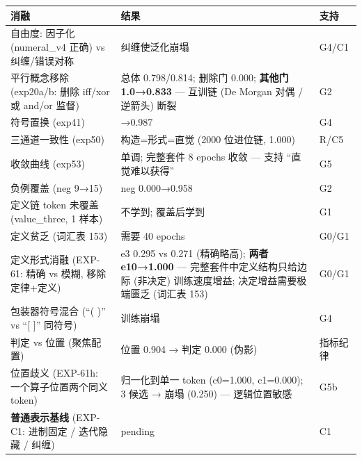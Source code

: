 \documentclass[
]{article}
\begin{document}
\begin{longtable}[]{@{}
  >{\raggedright\arraybackslash}p{}
  >{\raggedright\arraybackslash}p{}
  >{\raggedright\arraybackslash}p{}@{}}
\toprule\noalign{}
\begin{minipage}[b]{\linewidth}\raggedright
消融
\end{minipage} & \begin{minipage}[b]{\linewidth}\raggedright
结果
\end{minipage} & \begin{minipage}[b]{\linewidth}\raggedright
支持
\end{minipage} \\
\midrule\noalign{}
\endhead
\bottomrule\noalign{}
\endlastfoot
自由度: 因子化 (numeral\_v4 正确) vs 纠缠/错误对称 & 纠缠使泛化崩塌 &
G4/C1 \\
平行概念移除 (exp20a/b: 删除 iff/xor 或 and/or 监督) & 总体 0.798/0.814;
删除门 0.000; \textbf{其他门 1.0→0.833} --- 互训链 (De Morgan 对偶 /
逆箭头) 断裂 & G2 \\
符号置换 (exp41) & 0.996→0.987 & G4 \\
三通道一致性 (exp50) & 构造=形式=直觉 (2000 位进位链, 1.000) & R/C5 \\
收敛曲线 (exp53) & 单调; 完整套件 8 epochs 收敛 --- 支持
``直觉难以获得'' & G5 \\
负例覆盖 (neg 9→15) & neg 0.000→0.958 & G2 \\
定义链 token 未覆盖 (value\_three, 1 样本) & 不学到; 覆盖后学到 & G1 \\
定义贫乏 (词汇表 153) & 需要 40 epochs & G0/G1 \\
定义形式消融 (EXP-61: 精确 vs 模糊, 移除定律+定义) & e3 0.295 vs 0.271
(精确略高); \textbf{两者 e10→1.000} --- 完整套件中定义结构只给边际
(非决定) 训练速度增益; 决定增益需要极端匮乏 (词汇表 153) & G0/G1 \\
包装器符号混合 (``( )'' vs ``{[} {]}'' 同符号) & 训练崩塌 & G4 \\
判定 vs 位置 (聚焦配置) & 位置 0.904 → 判定 0.000 (伪影) & 指标纪律 \\
位置歧义 (EXP-61h: 一个算子位置两个同义 token) & 归一化到单一 token
(c0=1.000, c1=0.000); 3 候选 → 崩塌 (0.250) --- 逻辑位置敏感 & G5b \\
\textbf{普通表示基线} (EXP-C1: 进制固定 / 迭代隐藏 / 纠缠) & pending &
C1 \\
\end{longtable}
\end{document}
